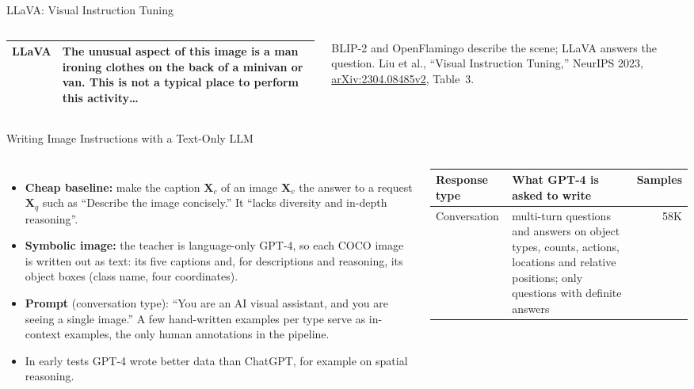 \begin{frame}{LLaVA: Visual Instruction Tuning}
\begin{columns}[T,onlytextwidth]
{\begin{tabular}{>{\raggedright\arraybackslash}p{1.7cm} >{\raggedright\arraybackslash}p{4.1cm}}
        \addlinespace[0.2em]
        LLaVA & The unusual aspect of this image is a man ironing clothes on the back of a minivan or van. This is not a typical place to perform this activity\ldots \\
        \bottomrule
      \end{tabular}\par}
      \vspace{0.4em}
      {\scriptsize\raggedright BLIP-2 and OpenFlamingo describe the scene; LLaVA answers the question. Liu et al., ``Visual Instruction Tuning,'' NeurIPS 2023, \href{https://arxiv.org/abs/2304.08485v2}{arXiv:2304.08485v2}, Table~3.\par}
  \end{columns}
\end{frame}

\begin{frame}{Writing Image Instructions with a Text-Only LLM}
  \begin{columns}[T,onlytextwidth]
      \begin{itemize}\footnotesize\itemsep0.35em
        \item \textbf{Cheap baseline:} make the caption $\mathbf{X}_c$ of an image $\mathbf{X}_v$ the answer to a request $\mathbf{X}_q$ such as ``Describe the image concisely.'' It ``lacks diversity and in-depth reasoning''.
        \item \textbf{Symbolic image:} the teacher is language-only GPT-4, so each COCO image is written out as text: its five captions and, for descriptions and reasoning, its object boxes (class name, four coordinates).
        \item \textbf{Prompt} (conversation type): ``You are an AI visual assistant, and you are seeing a single image.'' A few hand-written examples per type serve as in-context examples, the only human annotations in the pipeline.
        \item In early tests GPT-4 wrote better data than ChatGPT, for example on spatial reasoning.
      \end{itemize}
      \centering
      {\scriptsize\setlength{\tabcolsep}{4pt}
      \begin{tabular}{>{\raggedright\arraybackslash}p{1.65cm} >{\raggedright\arraybackslash}p{3.6cm} r}
        \toprule
        \textbf{Response type} & \textbf{What GPT-4 is asked to write} & \textbf{Samples} \\
        \midrule
        Conversation & multi-turn questions and answers on object types, counts, actions, locations and relative positions; only questions with definite answers & 58K \\

\end{tabular}}
\end{columns}
\end{frame}
